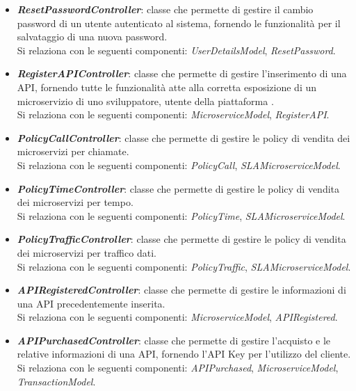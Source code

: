 \begin{itemize}
\begin{itemize}
		\item \textbf{\textit{ResetPasswordController}}: classe che permette di gestire il cambio password di un utente autenticato al sistema, fornendo le funzionalità per il salvataggio di una nuova password.\\
		Si relaziona con le seguenti componenti: \textit{UserDetailsModel}, \textit{ResetPassword}.
		
		\item \textbf{\textit{RegisterAPIController}}: classe che permette di gestire l'inserimento di una API, fornendo tutte le funzionalità atte alla corretta esposizione di un microservizio di uno sviluppatore, utente della piattaforma \progetto.\\
		Si relaziona con le seguenti componenti: \textit{MicroserviceModel}, \textit{RegisterAPI}.
		
		\item \textbf{\textit{PolicyCallController}}: classe che permette di gestire le policy di vendita dei microservizi per chiamate.\\
		Si relaziona con le seguenti componenti: \textit{PolicyCall}, \textit{SLAMicroserviceModel}.
		
		\item \textbf{\textit{PolicyTimeController}}: classe che permette di gestire le policy di vendita dei microservizi per tempo.\\
		Si relaziona con le seguenti componenti: \textit{PolicyTime}, \textit{SLAMicroserviceModel}.
		
		\item \textbf{\textit{PolicyTrafficController}}: classe che permette di gestire le policy di vendita dei microservizi per traffico dati.\\
		Si relaziona con le seguenti componenti: \textit{PolicyTraffic}, \textit{SLAMicroserviceModel}.
		
		\item \textbf{\textit{APIRegisteredController}}: classe che permette di gestire le informazioni di una API precedentemente inserita.\\
		Si relaziona con le seguenti componenti: \textit{MicroserviceModel}, \textit{APIRegistered}.
		
		\item \textbf{\textit{APIPurchasedController}}: classe che permette di gestire l'acquisto e le relative informazioni di una API, fornendo l'API Key per l'utilizzo del cliente.\\
		Si relaziona con le seguenti componenti: \textit{APIPurchased}, \textit{MicroserviceModel}, \textit{TransactionModel}.
		

\end{itemize}
\end{itemize}
